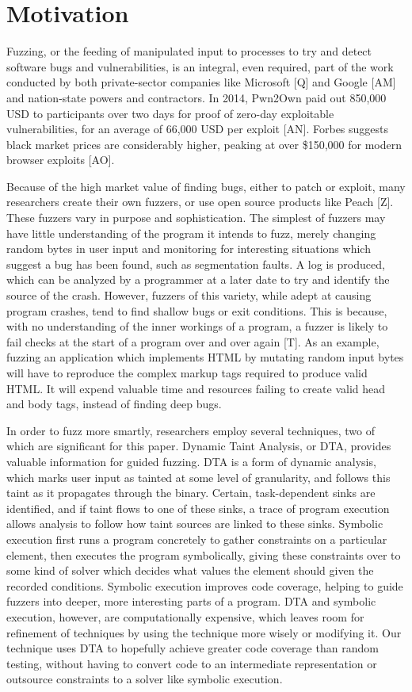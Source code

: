 \documentclass[11pt,expanded,copyright]{fsuthesis}
\begin{document}
\section{Motivation}

Fuzzing, or the feeding of manipulated input to processes to try and detect software bugs and vulnerabilities, is an integral, even required, part of the work conducted by both private-sector companies like Microsoft [Q] and Google [AM] and nation-state powers and contractors. In 2014, Pwn2Own paid out 850,000 USD to participants over two days for proof of zero-day exploitable vulnerabilities, for an average of 66,000 USD per exploit [AN]. Forbes suggests black market prices are considerably higher, peaking at over \$150,000 for modern browser exploits [AO].

Because of the high market value of finding bugs, either to patch or exploit, many researchers create their own fuzzers, or use open source products like Peach [Z]. These fuzzers vary in purpose and sophistication. The simplest of fuzzers may have little understanding of the program it intends to fuzz, merely changing random bytes in user input and monitoring for interesting situations which suggest a bug has been found, such as segmentation faults. A log is produced, which can be analyzed by a programmer at a later date to try and identify the source of the crash. However, fuzzers of this variety, while adept at causing program crashes, tend to find shallow bugs or exit conditions. This is because, with no understanding of the inner workings of a program, a fuzzer is likely to fail checks at the start of a program over and over again [T]. As an example, fuzzing an application which implements HTML by mutating random input bytes will have to reproduce the complex markup tags required to produce valid HTML. It will expend valuable time and resources failing to create valid head and body tags, instead of finding deep bugs.

In order to fuzz more smartly, researchers employ several techniques, two of which are significant for this paper. Dynamic Taint Analysis, or DTA, provides valuable information for guided fuzzing. DTA is a form of dynamic analysis, which marks user input as tainted at some level of granularity, and follows this taint as it propagates through the binary. Certain, task-dependent sinks are identified, and if taint flows to one of these sinks, a trace of program execution allows analysis to follow how taint sources are linked to these sinks. Symbolic execution first runs a program concretely to gather constraints on a particular element, then executes the program symbolically, giving these constraints over to some kind of solver which decides what values the element should given the recorded conditions. Symbolic execution improves code coverage, helping to guide fuzzers into deeper, more interesting parts of a program. DTA and symbolic execution, however, are computationally expensive, which leaves room for refinement of techniques by using the technique more wisely or modifying it. Our technique uses DTA to hopefully achieve greater code coverage than random testing, without having to convert code to an intermediate representation or outsource constraints to a solver like symbolic execution.
\end{document}
